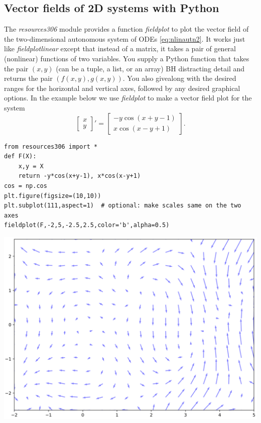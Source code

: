 \documentclass[12pt]{book}
\begin{document}

\subsection{Vector fields of 2D systems with Python}\label{Vector_fields_of_2D_systems_with_Python:subsection}

The \emph{resources306} module provides a function \emph{fieldplot} 
to plot the vector field of the two-dimensional autonomous system of ODEs \eqref{eq:nlinautn2}.
It works just like \emph{fieldplotlinear} except that 
{\color{blue} instead of a matrix,}
it takes a {\color{blue}pair of} 
{\color{red}general (nonlinear)}
function{\color{blue}s} of two variables.
You supply a Python function that takes the pair $(x,y)$ 
{\color{red}(can be a tuple, a list, or an array)}
{\color{teal}BH distracting detail}
and returns the pair $(f(x,y),g(x,y))$.
{\color{blue}You also give}{\color{red}along with} the desired ranges for the horizontal and vertical axes, followed by any desired graphical options.
In the example below we use \emph{fieldplot} to make a vector field plot for the system
\begin{equation} 
\begin{bmatrix} x \\ y \end{bmatrix} ' =
\begin{bmatrix} -y \cos(x+y-1) \\ x \cos(x-y+1) \end{bmatrix} .
\end{equation}


\begin{small}
\begin{verbatim}
from resources306 import *
def F(X):
    x,y = X
    return -y*cos(x+y-1), x*cos(x-y+1)
cos = np.cos
plt.figure(figsize=(10,10))
plt.subplot(111,aspect=1)  # optional: make scales same on the two axes
fieldplot(F,-2,5,-2.5,2.5,color='b',alpha=0.5)

\end{verbatim}
\end{small}

\parbox[c]{3.1in}{\includegraphics[width=5.5in]{additional_figures/Nonlinear_systems__fieldplot}}
\newpage
\end{document}
